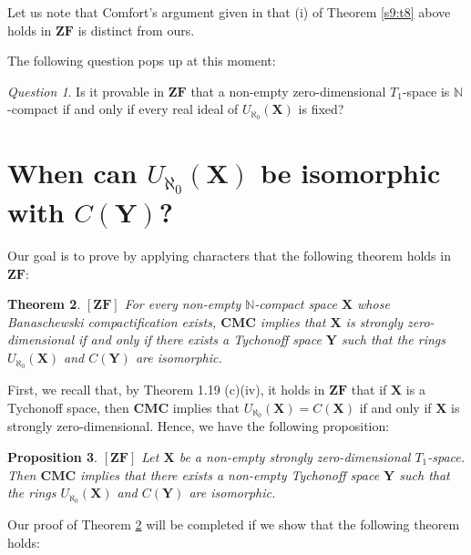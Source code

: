 \documentclass[12pt,twoside,leqno]{article}
\theoremstyle{plain}
\newtheorem{theorem}{Theorem}[section]
\newtheorem{proposition}[theorem]{Proposition}
\theoremstyle{definition}
\theoremstyle{remark}
\newtheorem{question}[theorem]{Question}
\begin{document}
Let us note that Comfort's argument given in \cite{com} that (i) of Theorem \ref{s9:t8} above holds in $\mathbf{ZF}$ is distinct from ours.

The following question pops up at this moment:

\begin{question}
	\label{s9:q9}
	Is it provable in $\mathbf{ZF}$ that a non-empty zero-dimensional $T_1$-space is $\mathbb{N}$-compact if and only if every real ideal of $U_{\aleph_0}(\mathbf{X})$ is fixed?
\end{question}


\section{When can $U_{\aleph_0}(\mathbf{X})$ be isomorphic with $C(\mathbf{Y})$?}
\label{s10}

Our goal is to prove by applying characters that the following theorem  holds in $\mathbf{ZF}$:

\begin{theorem}
	\label{s10:t1}
	$[\mathbf{ZF}]$ For every non-empty $\mathbb{N}$-compact space $\mathbf{X}$ whose Banaschewski compactification exists, $\mathbf{CMC}$ implies that $\mathbf{X}$ is strongly zero-dimensional if and only if there exists a Tychonoff space $\mathbf{Y}$ such that the rings $U_{\aleph_0}(\mathbf{X})$ and $C(\mathbf{Y})$ are isomorphic.
\end{theorem}

First, we recall that, by Theorem 1.19 (c)(iv), it holds in $\mathbf{ZF}$ that if $\mathbf{X}$ is a Tychonoff space, then  $\mathbf{CMC}$ implies that $U_{\aleph_0}(\mathbf{X})=C(\mathbf{X})$ if and only if $\mathbf{X}$ is strongly zero-dimensional. Hence, we have the following proposition:

\begin{proposition}
	\label{s10:p2}
	$[\mathbf{ZF}]$ Let $\mathbf{X}$ be a non-empty strongly zero-dimensional $T_1$-space. Then $\mathbf{CMC}$ implies that there exists a non-empty Tychonoff space $\mathbf{Y}$ such that the rings $U_{\aleph_0}(\mathbf{X})$ and $C(\mathbf{Y})$ are isomorphic.
\end{proposition}

Our proof of Theorem \ref{s10:t1} will be completed if we show that the following theorem holds:
\end{document}
